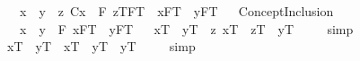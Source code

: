 \begin{isabellebody}
\ \ \ {\isachardoublequoteopen}x\ {\isasymOplus}\ y\ {\isasymequiv}\ \isactrlbold {\isasymiota}z{\isachardot}\ {\isacharparenleft}{\isasymlparr}C{\isacharbang}{\isacharcomma}x{\isasymrparr}\ \isactrlbold {\isasymand}\ {\isacharparenleft}\isactrlbold {\isasymforall}F{\isachardot}\ {\isacharparenleft}{\isasymlbrace}z\isactrlsup T{\isacharcomma}F\isactrlsup T{\isasymrbrace}\ \isactrlbold {\isasymequiv}\ {\isasymlbrace}x{\isacharcomma}F\isactrlsup T{\isasymrbrace}\ \isactrlbold {\isasymor}\ {\isasymlbrace}y{\isacharcomma}F\isactrlsup T{\isasymrbrace}{\isacharparenright}{\isacharparenright}{\isacharparenright}{\isachardoublequoteclose}\isanewline
\ \isamarkupfalse%
\ ConceptInclusion\ {\isacharparenleft}\ {\isachardoublequoteopen}{\isasympreceq}{\isachardoublequoteclose}\ {}{}{}{\isacharparenright}\ \isanewline
\ \ \ {\isachardoublequoteopen}x\ {\isasympreceq}\ y\ {\isasymequiv}\ \isactrlbold {\isasymforall}F{\isachardot}\ {\isacharparenleft}{\isasymlbrace}x{\isacharcomma}F\isactrlsup T{\isasymrbrace}\ \isactrlbold {\isasymrightarrow}\ {\isasymlbrace}y{\isacharcomma}F\isactrlsup T{\isasymrbrace}{\isacharparenright}{\isachardoublequoteclose}\isanewline
\ \isanewline
{}\isamarkupfalse%
\ {\isachardoublequoteopen}{\isacharbrackleft}x\isactrlsup T\ {\isasympreceq}\ y\isactrlsup T\ \isactrlbold {\isasymequiv}\ {\isacharparenleft}\isactrlbold {\isasymexists}z{\isachardot}\ {\isacharparenleft}{\isacharparenleft}x\isactrlsup T\ {\isasymOplus}\ z\isactrlsup T{\isacharparenright}\ \isactrlbold {\isacharequal}\ y\isactrlsup T{\isacharparenright}{\isacharparenright}{\isacharbrackright}\ {\isacharequal}\ {\isasymtop}{\isachardoublequoteclose}%
\isadelimproof
\ %
\endisadelimproof
%
\isatagproof
{}\isamarkupfalse%
\ simp\ \isamarkupfalse%
%
\endisatagproof
{\isafoldproof}%
%
\isadelimproof
%
\endisadelimproof
\isanewline
{}\isamarkupfalse%
\ {\isachardoublequoteopen}{\isacharbrackleft}x\isactrlsup T\ {\isasympreceq}\ y\isactrlsup T\ \isactrlbold {\isasymequiv}\ {\isacharparenleft}x\isactrlsup T\ {\isasymOplus}\ y\isactrlsup T\ \isactrlbold {\isacharequal}\ y\isactrlsup T{\isacharparenright}{\isacharbrackright}\ {\isacharequal}\ {\isasymtop}{\isachardoublequoteclose}%
\isadelimproof
\ %
\endisadelimproof
%
\isatagproof
{}\isamarkupfalse%
\ simp\ \ \isamarkupfalse%
%
\endisatagproof
{\isafoldproof}%
%
\isadelimproof
%
\endisadelimproof
\isanewline
\isanewline
\isanewline

\end{isabellebody}
